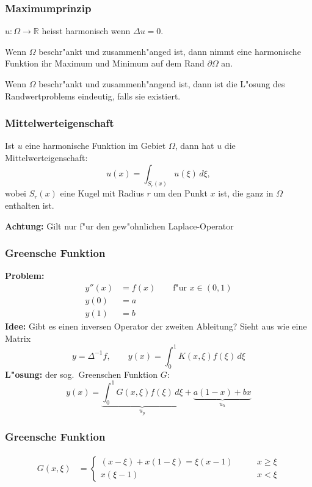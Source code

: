 \documentclass{beamer}
\begin{document}
\begin{frame}
\frametitle{Maximumprinzip}
\begin{definition}
$u\colon\Omega\to\mathbb R$ heisst harmonisch wenn $\Delta u=0$.
\end{definition}

\pause

\begin{theorem}
Wenn $\Omega$ beschr"ankt und zusammenh"anged ist, dann nimmt eine
harmonische Funktion ihr Maximum und Minimum auf dem Rand $\partial\Omega$ an.
\end{theorem}

\pause

\begin{theorem}
Wenn $\Omega$ beschr"ankt und zusammenh"angend ist, dann ist die 
L"osung des Randwertproblems eindeutig, falls sie existiert.
\end{theorem}

\end{frame}

\begin{frame}
\frametitle{Mittelwerteigenschaft}

\begin{theorem}
Ist $u$ eine harmonische Funktion im Gebiet $\Omega$, dann hat $u$ die
Mittelwerteigenschaft:
\[
u(x)= \int_{S_r(x)}u(\xi)\,d\xi,
\]
wobei $S_r(x)$ eine Kugel mit Radius $r$ um den Punkt $x$ ist, die ganz
in $\Omega$ enthalten ist.
\end{theorem}

{\bf Achtung:} Gilt nur f"ur den gew"ohnlichen Laplace-Operator

\end{frame}

\begin{frame}
\frametitle{Greensche Funktion}
{\bf Problem:}
\begin{align*}
y''(x)&=f(x) \qquad\text{f"ur $x \in (0,1)$}\\
y(0)&=a\\
y(1)&=b
\end{align*}
{\bf Idee:} Gibt es einen inversen Operator der zweiten Ableitung?
\pause
Sieht aus wie eine Matrix
\[
y = \Delta^{-1}f,
\qquad
y(x)=\int_0^1 K(x,\xi)f(\xi)\,d\xi
\]
\pause
{\bf L"osung:} der sog.~Greenschen Funktion $G$:
\[
y(x)=\underbrace{\int_0^1 G(x,\xi)f(\xi)\,d\xi}_{u_p}
+
\underbrace{a(1-x) + bx}_{u_h}
\]
\end{frame}

\begin{frame}
\frametitle{Greensche Funktion}
\begin{align*}
G(x,\xi)
&=
\begin{cases}
(x-\xi) + x(1-\xi) = \xi(x - 1)&\qquad x\ge \xi\\
x(\xi-1)&\qquad x<\xi
\end{cases}
\end{align*}
\end{frame}
\end{document}
